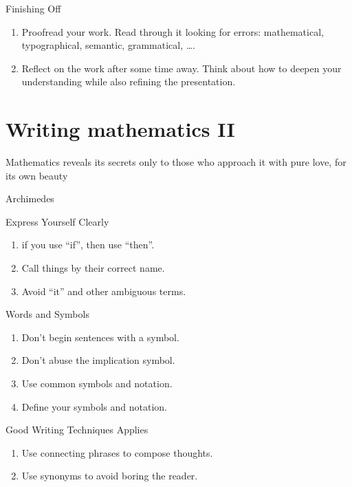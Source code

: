 \documentclass[12pt]{book}
\begin{document}
\begin{definition}{Finishing Off}{}
	\begin{enumerate}[label = {(\arabic*)}]
		\item Proofread your work. Read through it looking for errors:
		      mathematical, typographical, semantic, grammatical, \ldots.
		\item Reflect on the work after some time away. Think about how to
		      deepen your understanding while also refining the presentation.
	\end{enumerate}
\end{definition}

\chapter{Writing mathematics II}
\epigraph{Mathematics reveals its secrets only to those who approach it with
	pure love, for its own beauty} {Archimedes}

\begin{definition}{Express Yourself Clearly}{}
	\begin{enumerate}[label = {(\arabic*)}]
		\item if you use ``if'', then use ``then''.
		\item Call things by their correct name.
		\item Avoid ``it'' and other ambiguous terms.
	\end{enumerate}
\end{definition}
\begin{definition}{Words and Symbols}{}
	\begin{enumerate}[label = {(\arabic*)}]
		\item Don’t begin sentences with a symbol.
		\item Don't abuse the implication symbol.
		\item Use common symbols and notation.
		\item Define your symbols and notation.
	\end{enumerate}
\end{definition}
\begin{definition}{Good Writing Techniques Applies}{}
	\begin{enumerate}[label = {(\arabic*)}]
		\item Use connecting phrases to compose thoughts.
		\item Use synonyms to avoid boring the reader.
	\end{enumerate}
\end{definition}
\end{document}
